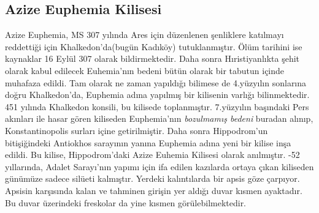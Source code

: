 \subsection{Azize Euphemia Kilisesi}
\indent\indent Azize Euphemia, MS 307 yılında Ares için düzenlenen şenliklere katılmayı reddettiği için Khalkedon'da(bugün Kadıköy) tutuklanmıştır. Ölüm tarihini ise kaynaklar 16 Eylül 307 olarak bildirmektedir. Daha sonra Hıristiyanlıkta şehit olarak kabul edilecek Euhemia'nın bedeni bütün olarak bir tabutun içinde muhafaza edildi. Tam olarak ne zaman yapıldığı bilimese de 4.yüzyılın sonlarına doğru Khalkedon'da, Euphemia adına yapılmış bir kilisenin varlığı bilinmektedir. 451 yılında Khalkedon konsili, bu kilisede toplanmıştır. 7.yüzyılın başındaki Pers akınları ile hasar gören kiliseden Euphemia'nın \textit{bozulmamış bedeni} buradan alınıp, Konstantinopolis surları içine getirilmiştir. Daha sonra Hippodrom'un bitişiğindeki Antiokhos sarayının yanına Euphemia adına yeni bir kilise inşa edildi. Bu kilise, Hippodrom'daki Azize Euhemia Kilisesi olarak anılmıştır.\cite{euphemia}\newline
{}-52 yıllarında, Adalet Sarayı'nın yapımı için ifa edilen kazılarda ortaya çıkan kiliseden günümüze sadece silüeti kalmıştır. Yerdeki kalıntılarda bir apsis göze çarpıyor. Apsisin karşısında kalan ve tahminen girişin yer aldığı duvar kısmen ayaktadır. Bu duvar üzerindeki freskolar da yine kısmen görülebilmektedir.
